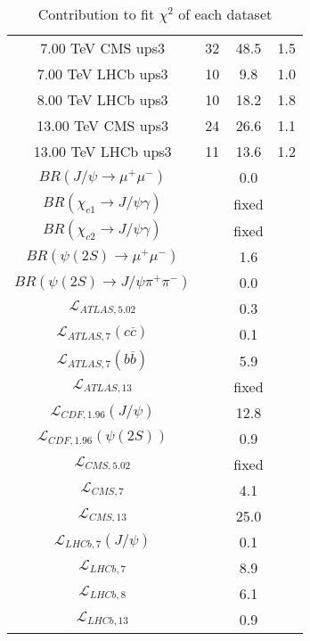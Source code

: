 \begin{table}[h!]
\begin{tabular}{c|c|c|c}
7.00 TeV CMS ups3 & 32 & 48.5 & 1.5 \\
7.00 TeV LHCb ups3 & 10 & 9.8 & 1.0 \\
8.00 TeV LHCb ups3 & 10 & 18.2 & 1.8 \\
13.00 TeV CMS ups3 & 24 & 26.6 & 1.1 \\
13.00 TeV LHCb ups3 & 11 & 13.6 & 1.2 \\
\hline
$BR(J/\psi\rightarrow\mu^+\mu^-)$ &  & 0.0 &  \\
$BR(\chi_{c1}\rightarrow J/\psi\gamma)$ &  & fixed & \\
$BR(\chi_{c2}\rightarrow J/\psi\gamma)$ &  & fixed & \\
$BR(\psi(2S)\rightarrow\mu^+\mu^-)$ &  & 1.6 &  \\
$BR(\psi(2S)\rightarrow J/\psi\pi^+\pi^-)$ &  & 0.0 &  \\
$\mathcal L_{ATLAS,5.02}$ &  & 0.3 &  \\
$\mathcal L_{ATLAS,7}(c\overline c)$ &  & 0.1 &  \\
$\mathcal L_{ATLAS,7}(b\overline b)$ &  & 5.9 &  \\
$\mathcal L_{ATLAS,13}$ &  & fixed & \\
$\mathcal L_{CDF,1.96}(J/\psi)$ &  & 12.8 &  \\
$\mathcal L_{CDF,1.96}(\psi(2S))$ &  & 0.9 &  \\
$\mathcal L_{CMS,5.02}$ &  & fixed & \\
$\mathcal L_{CMS,7}$ &  & 4.1 &  \\
$\mathcal L_{CMS,13}$ &  & 25.0 &  \\
$\mathcal L_{LHCb,7}(J/\psi)$ &  & 0.1 &  \\
$\mathcal L_{LHCb,7}$ &  & 8.9 &  \\
$\mathcal L_{LHCb,8}$ &  & 6.1 &  \\
$\mathcal L_{LHCb,13}$ &  & 0.9 &  \\
\end{tabular}
\caption{Contribution to fit $\chi^2$ of each dataset}
\end{table}
